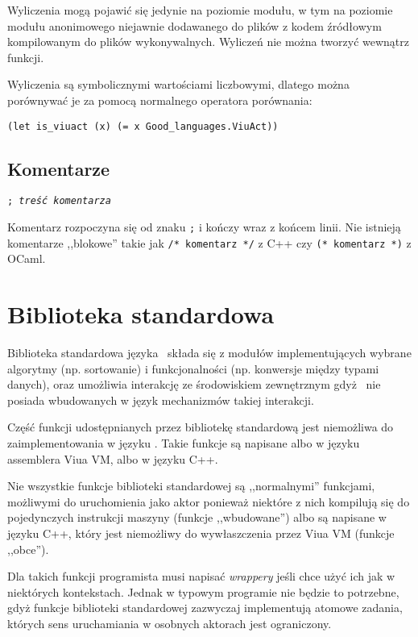 Wyliczenia mogą pojawić się jedynie na poziomie modułu, w tym na poziomie modułu anonimowego niejawnie
dodawanego do plików z kodem źródłowym kompilowanym do plików wykonywalnych. Wyliczeń nie można tworzyć
wewnątrz funkcji.

Wyliczenia są symbolicznymi wartościami liczbowymi, dlatego można porównywać je
za pomocą normalnego operatora porównania:

\begin{lstlisting}
(let is_viuact (x) (= x Good_languages.ViuAct))
\end{lstlisting}

\subsection{Komentarze}

\texttt{; \emph{treść komentarza}}
\newline

Komentarz rozpoczyna się od znaku \texttt{;} i kończy wraz z końcem linii.
Nie istnieją komentarze ,,blokowe'' takie jak \texttt{/* komentarz */} z C++ czy
\texttt{(* komentarz *)} z OCaml.

\section{Biblioteka standardowa}

Biblioteka standardowa języka \ViuAct\ składa się z modułów implementujących
wybrane algorytmy (np. sortowanie) i funkcjonalności (np. konwersje między
typami danych), oraz umożliwia interakcję ze środowiskiem zewnętrznym gdyż
\ViuAct\ nie posiada wbudowanych w język mechanizmów takiej interakcji.

Część funkcji udostępnianych przez bibliotekę standardową jest niemożliwa do zaimplementowania w języku
\ViuAct. Takie funkcje są napisane albo w języku assemblera Viua VM, albo w języku C++.

Nie wszystkie funkcje biblioteki standardowej są ,,normalnymi'' funkcjami, możliwymi do uruchomienia jako
aktor ponieważ niektóre z nich kompilują się do pojedynczych instrukcji maszyny (funkcje ,,wbudowane'') albo
są napisane w języku C++, który jest niemożliwy do wywłaszczenia przez Viua VM (funkcje ,,obce'').

Dla takich funkcji programista musi napisać \emph{wrappery} jeśli chce użyć ich jak w niektórych kontekstach.
Jednak w typowym programie nie będzie to potrzebne, gdyż funkcje biblioteki standardowej zazwyczaj
implementują atomowe zadania, których sens uruchamiania w osobnych aktorach jest ograniczony.

